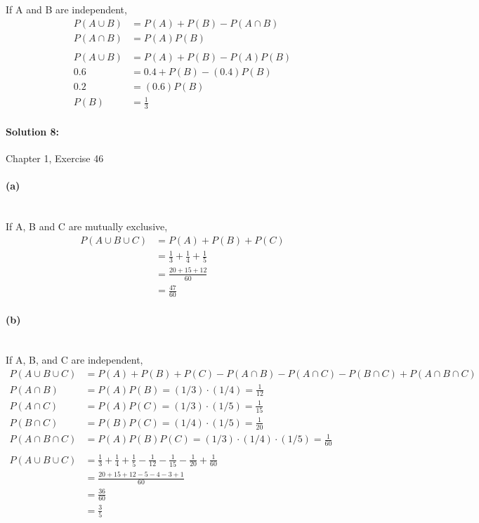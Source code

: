 \documentclass[a4paper]{article}
\begin{document}
\indent If A and B are independent,
\begin{align*}
P(A \cup B) &= P(A) + P(B) - P(A \cap B) \\
P(A \cap B) &= P(A)P(B) \\ \\
P(A \cup B) &= P(A) + P(B) - P(A)P(B) \\
        0.6 &= 0.4 + P(B) - (0.4)P(B) \\
        0.2 &= (0.6)P(B) \\
       P(B) &= \frac{1}{3}
\end{align*}

\paragraph{Solution 8:}
Chapter 1, Exercise 46

\paragraph{(a)} ~\\

\indent If A, B and C are mutually exclusive,
\begin{align*}
P(A \cup B \cup C) &= P(A) + P(B) + P(C) \\
                   &= \frac{1}{3} + \frac{1}{4} + \frac{1}{5} \\
                   &= \frac{20+15+12}{60} \\
                   &= \frac{47}{60}
\end{align*}

\paragraph{(b)} ~\\

\indent If A, B, and C are independent,
\begin{align*}
P(A \cup B \cup C) &= P(A) + P(B) + P(C) - P(A \cap B) - P(A \cap C) - P(B \cap C) + P(A \cap B \cap C) \\
       P(A \cap B) &= P(A)P(B) = (1/3) \cdot (1/4) = \frac{1}{12} \\
       P(A \cap C) &= P(A)P(C) = (1/3) \cdot (1/5) = \frac{1}{15} \\
       P(B \cap C) &= P(B)P(C) = (1/4) \cdot (1/5) = \frac{1}{20} \\
P(A \cap B \cap C) &= P(A)P(B)P(C) = (1/3) \cdot (1/4) \cdot (1/5) = \frac{1}{60} \\ \\
P(A \cup B \cup C) &= \frac{1}{3} + \frac{1}{4} + \frac{1}{5} - \frac{1}{12} - \frac{1}{15} - \frac{1}{20} + \frac{1}{60} \\
                   &= \frac{20+15+12-5-4-3+1}{60} \\
                   &= \frac{36}{60} \\
                   &= \frac{3}{5}
\end{align*}
\end{document}
